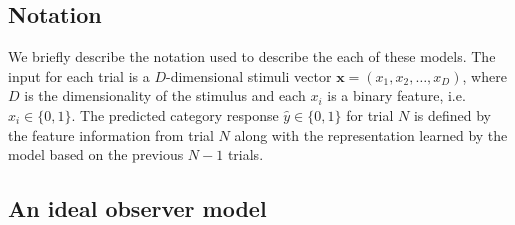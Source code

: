 \documentclass[a4paper, doc, floatsintext]{apa6}
\begin{document}
\subsection{Notation}

We briefly describe the notation used to describe the each of these models. The input for each trial is a \(D\)-dimensional stimuli vector \(\textbf{x} = (x_1, x_2, \dots, x_D)\), where \(D\) is the dimensionality of the stimulus and each $x_i$ is a binary feature, i.e. \(x_i \in \{0, 1\}\). The predicted category response \(\hat{y} \in \{0, 1\}\) for trial \(N\) is defined by the feature information from trial \(N\) along with the representation learned by the model based on the previous \(N-1\) trials.

\subsection{An ideal observer model}

\end{document}
